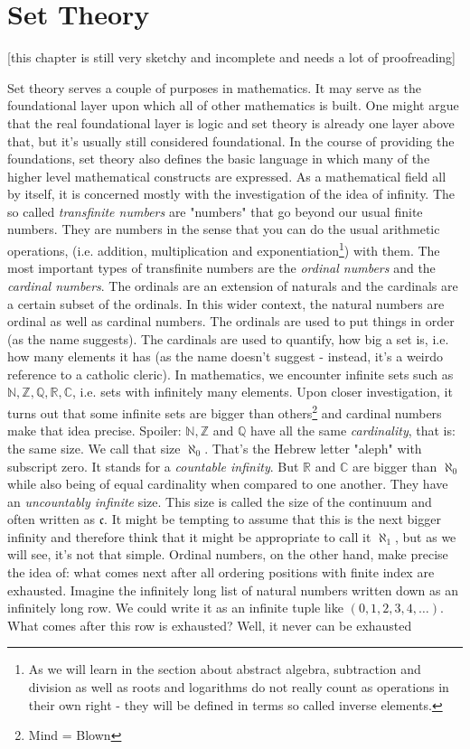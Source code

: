 \chapter{Set Theory}
[this chapter is still very sketchy and incomplete and needs a lot of proofreading]


Set theory serves a couple of purposes in mathematics. It may serve as the foundational layer upon which all of other mathematics is built. One might argue that the real foundational layer is logic and set theory is already one layer above that, but it's usually still considered foundational. In the course of providing the foundations, set theory also defines the basic language in which many of the higher level mathematical constructs are expressed. As a mathematical field all by itself, it is concerned mostly with the investigation of the idea of infinity. The so called \emph{transfinite numbers} are "numbers" that go beyond our usual finite numbers. They are numbers in the sense that you can do the usual arithmetic operations, (i.e. addition, multiplication and exponentiation\footnote{As we will learn in the section about abstract algebra, subtraction and division as well as roots and logarithms do not really count as operations in their own right - they will be defined in terms so called inverse elements.}) with them. The most important types of transfinite numbers are the \emph{ordinal numbers} and the \emph{cardinal numbers}. The ordinals are an extension of naturals and the cardinals are a certain subset of the ordinals. In this wider context, the natural numbers are ordinal as well as cardinal numbers. The ordinals are used to put things in order (as the name suggests). The cardinals are used to quantify, how big a set is, i.e. how many elements it has (as the name doesn't suggest - instead, it's a weirdo reference to a catholic cleric). In mathematics, we encounter infinite sets such as $\mathbb{N}, \mathbb{Z}, \mathbb{Q}, \mathbb{R}, \mathbb{C}$, i.e. sets with infinitely many elements. Upon closer investigation, it turns out that some infinite sets are bigger than others\footnote{Mind = Blown} and cardinal numbers make that idea precise. Spoiler: $\mathbb{N}, \mathbb{Z}$ and $\mathbb{Q}$ have all the same \emph{cardinality}, that is: the same size. We call that size $\aleph_0$. That's the Hebrew letter "aleph" with subscript zero. It stands for a \emph{countable infinity}. But $\mathbb{R}$ and $\mathbb{C}$ are bigger than $\aleph_0$ while also being of equal cardinality when compared to one another. They have an \emph{uncountably infinite} size. This size is called the size of the continuum and often written as $\mathfrak{c}$. It might be tempting to assume that this is the next bigger infinity and therefore think that it might be appropriate to call it $\aleph_1$, but as we will see, it's not that simple. Ordinal numbers, on the other hand, make precise the idea of: what comes next after all ordering positions with finite index are exhausted. Imagine the infinitely long list of natural numbers written down as an infinitely long row. We could write it as an infinite tuple like $(0,1,2,3,4,\ldots)$. What comes after this row is exhausted? Well, it never can be exhausted 